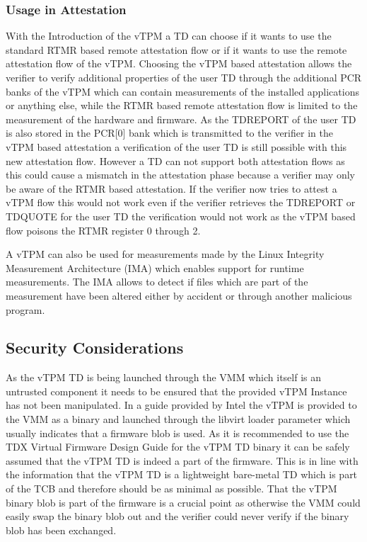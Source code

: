 \documentclass[sigplan,screen,nonacm]{acmart}
\begin{document}
\subsubsection{Usage in Attestation}
With the Introduction of the vTPM a TD can choose if it wants to use the standard RTMR based remote attestation flow or if it wants to use the remote attestation flow of the vTPM.
Choosing the vTPM based attestation allows the verifier to verify additional properties of the user TD through the additional PCR banks of the vTPM which can contain measurements of the installed applications or anything else, while the RTMR based remote attestation flow is limited to the measurement of the hardware and firmware.
As the TDREPORT of the user TD is also stored in the PCR[0] bank which is transmitted to the verifier in the vTPM based attestation a verification of the user TD is still possible with this new attestation flow.
However a TD can not support both attestation flows as this could cause a mismatch in the attestation phase because a verifier may only be aware of the RTMR based attestation.
If the verifier now tries to attest a vTPM flow this would not work even if the verifier retrieves the TDREPORT or TDQUOTE for the user TD the verification would not work as the vTPM based flow poisons the RTMR register 0 through 2.

A vTPM can also be used for measurements made by the Linux Integrity Measurement Architecture (IMA) which enables support for runtime measurements\cite{Intel-IMA}.
The IMA allows to detect if files which are part of the measurement have been altered either by accident or through another malicious program.

\subsection{Security Considerations}
As the vTPM TD is being launched through the VMM which itself is an untrusted component it needs to be ensured that the provided vTPM Instance has not been manipulated.
In a guide provided by Intel the vTPM is provided to the VMM as a binary and launched through the libvirt loader parameter which usually indicates that a firmware blob is used\cite[p. 84]{Intel-linux-tdx}\cite{libvirt}.
As it is recommended to use the TDX Virtual Firmware Design Guide for the vTPM TD binary it can be safely assumed that the vTPM TD is indeed a part of the firmware\cite[p. 20]{Intel-vTPM}.
This is in line with the information that the vTPM TD is a lightweight bare-metal TD which is part of the TCB and therefore should be as minimal as possible\cite[p. 18]{Intel-vTPM}.
That the vTPM binary blob is part of the firmware is a crucial point as otherwise the VMM could easily swap the binary blob out and the verifier could never verify if the binary blob has been exchanged.
\end{document}
